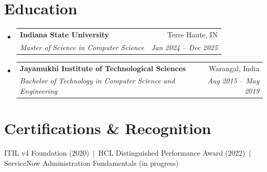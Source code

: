 \documentclass[letterpaper,10.5pt]{article}
\makeatletter
\newcommand{\resumeSubheading}[4]{
  \vspace{-2pt}\item
    \begin{tabular*}{0.97\textwidth}[t]{l@{\extracolsep{\fill}}r}
      \textbf{#1} & #2 \\
      \textit{\small#3} & \textit{\small #4} \\
    \end{tabular*}\vspace{-7pt}
}
\newcommand{\resumeSubHeadingListStart}{\begin{itemize}[leftmargin=0.15in, label={}]}
\newcommand{\resumeSubHeadingListEnd}{\end{itemize}}
\makeatother
\begin{document}
\section{Education}
  \resumeSubHeadingListStart
    \resumeSubheading
      {Indiana State University}{Terre Haute, IN}
      {Master of Science in Computer Science}{Jan 2024 -- Dec 2025}
    \resumeSubheading
      {Jayamukhi Institute of Technological Sciences}{Warangal, India}
      {Bachelor of Technology in Computer Science and Engineering}{Aug 2015 -- May 2019}
  \resumeSubHeadingListEnd

\section{Certifications \& Recognition}
 \begin{itemize}[leftmargin=0.15in, label={}]
    \small{\item{ITIL v4 Foundation (2020) \,$|$\, HCL Distinguished Performance Award (2022) \,$|$\, ServiceNow Administration Fundamentals (in progress)}}
 \end{itemize}
\end{document}
